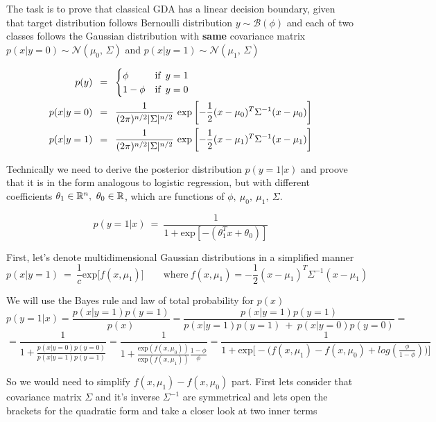 \documentclass{article}
\begin{document}
The task is to prove that classical GDA has a linear decision boundary, given that target distribution follows Bernoulli distribution $ y \sim \mathcal{B}(\phi)$ and each of two classes follows the Gaussian distribution with {\bf same} covariance matrix $p(x | y = 0) \sim \mathcal{N}(\mu_0,\,\Sigma)$ and $p(x | y = 1) \sim \mathcal{N}(\mu_1,\,\Sigma)$

\begin{align}
	p(y) \enskip &= \enskip 
		\begin{cases}
			\phi & \text{if} \enskip y = 1 \\
			1 - \phi & \text{if} \enskip y = 0
		\end{cases} \\
	p(x | y = 0) \enskip &= \enskip
		\frac 1{(2\pi)^{n/2} |\Sigma|^{n/2}} \ \text{exp}
				\left[
					-\frac12 (x - \mu_0)^T \Sigma^{-1} (x - \mu_0)
				\right] \\
	p(x | y = 1) \enskip &= \enskip
		\frac 1{(2\pi)^{n/2} |\Sigma|^{n/2}} \ \text{exp}
				\left[
					-\frac12 (x - \mu_1)^T \Sigma^{-1} (x - \mu_1)
				\right]
\end{align}
\bigbreak

Technically we need to derive the posterior distribution $p(y = 1 | x)$ and proove that it is in the form analogous to logistic regression, but with different coefficients $\theta_1 \in {\Bbb R}^n, \ \theta_0 \in {\Bbb R}$, which are functions of $\phi,\ \mu_0,\ \mu_1,\ \Sigma $.

\[
	p(y = 1| x) \ = \ \frac1{1 + \text{exp}[-(\theta_1^T x + \theta_0)]}
\]
\bigbreak

First, let's denote multidimensional Gaussian distributions in a simplified manner
\[
	p(x | y = 1 ) \ =  \ \frac1{c} \text{exp} \big[ f(x, \mu_1) \big] \qquad \text{where} \ f(x, \mu_1) = -\frac12 (x - \mu_1)^T \Sigma^{-1} (x - \mu_1)
\]
\bigbreak

We will use the Bayes rule and law of total probability for $p(x)$
\[
p(y = 1| x) = 
\frac{p(x| y=1)p(y=1)} {p(x)} = 
\frac{p(x| y=1)p(y=1)} {p(x| y=1)p(y=1) \ + \ p(x| y=0)p(y=0)} =
\]
\[
=\frac1 {1 + \frac{p(x| y=0)p(y=0)}{p(x| y=1)p(y=1)}}
=\frac1 {1 + \frac{\text{exp} (f(x, \mu_0))}{\text{exp}(f(x, \mu_1))}\frac{1-\phi}{\phi}} 
=\frac1 {1 + \text{exp} \Big [-\Big (f(x, \mu_1) - f(x, \mu_0) + log(\frac{\phi}{1-\phi}) \Big) \Big ]}
\]
\bigbreak

So we would need to simplify $f(x, \mu_1) - f(x, \mu_0)$ part. First lets consider that covariance matrix $\Sigma$ and it's inverse $\Sigma^{-1}$ are symmetrical and lets open the brackets for the quadratic form and take a closer look at two inner terms
\end{document}

